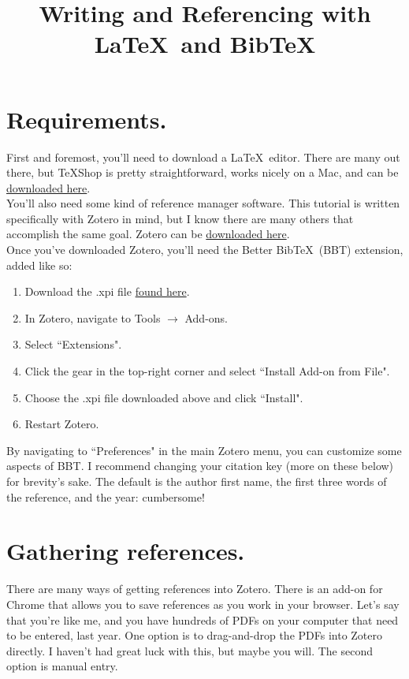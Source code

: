 \documentclass[11pt]{article}
\begin{document}
\title{Writing and Referencing with \LaTeX\ and Bib\TeX}
\maketitle
\section{Requirements.}

First and foremost, you'll need to download a \LaTeX \ editor. There are many out there, but \TeX Shop is pretty straightforward, works nicely on a Mac, and can be \href{https://pages.uoregon.edu/koch/texshop/obtaining.html}{downloaded here}.\\

You'll also need some kind of reference manager software. This tutorial is written specifically with Zotero in mind, but I know there are many others that accomplish the same goal. Zotero can be \href{https://www.zotero.org/download/}{downloaded here}.\\

Once you've downloaded Zotero, you'll need the Better Bib\TeX\ (BBT) extension, added like so:
\begin{enumerate}
\item{Download the .xpi file \href{https://github.com/retorquere/zotero-better-bibtex/releases/tag/v5.2.20}{found here}.}
\item{In Zotero, navigate to Tools $\rightarrow$ Add-ons.}
\item{Select ``Extensions".}
\item{Click the gear in the top-right corner and select ``Install Add-on from File".}
\item{Choose the .xpi file downloaded above and click ``Install".}
\item{Restart Zotero.}
\end{enumerate}

By navigating to ``Preferences" in the main Zotero menu, you can customize some aspects of BBT. I recommend changing your citation key (more on these below) for brevity's sake.  The default is the author first name, the first three words of the reference, and the year: cumbersome!\\

\section{Gathering references.}

There are many ways of getting references into Zotero. There is an add-on for Chrome that allows you to save references as you work in your browser. Let's say that you're like me, and you have hundreds of PDFs on your computer that need to be entered, last year. One option is to drag-and-drop the PDFs into Zotero directly. I haven't had great luck with this, but maybe you will. The second option is manual entry.\\
\end{document}
